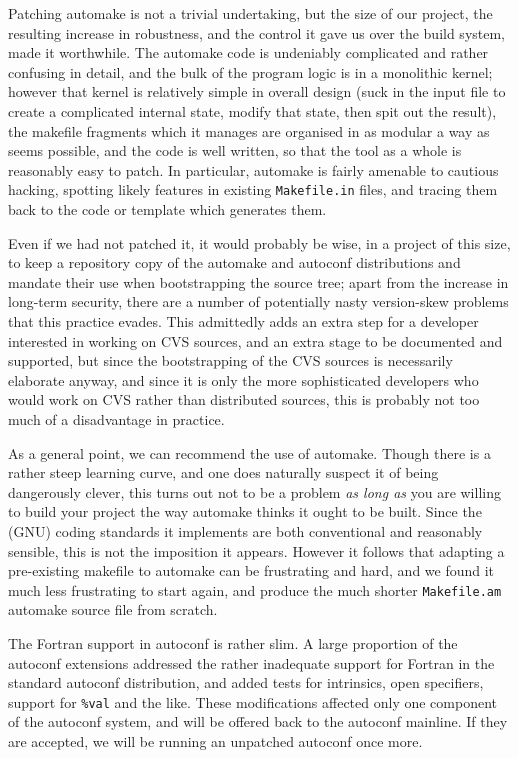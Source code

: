 \documentclass{speauth}
\begin{document}
Patching automake is not a trivial undertaking, but the size of our
project, the resulting increase in robustness, and the control it gave
us over the build system, made it worthwhile.  The automake code is
undeniably complicated and rather confusing in detail, and the bulk of
the program logic is in a monolithic kernel; however that kernel is
relatively simple in overall design (suck in the input file to create
a complicated internal state, modify that state, then spit out
the result), the makefile fragments which it manages are organised in
as modular a way as seems possible, and the code is well written, so
that the tool as a whole is reasonably easy to patch.  In particular,
automake is fairly amenable to cautious hacking, spotting likely
features in existing \texttt{Makefile.in} files, and tracing them back
to the code or template which generates them.

Even if we had not patched it, it
would probably be wise, in a project of this size, to keep a
repository copy of the automake and autoconf distributions and mandate
their use when bootstrapping the source tree; apart from the increase
in long-term security, there are a number of potentially nasty
version-skew problems that this practice evades.  This admittedly adds
an extra step for a developer interested in working on CVS sources,
and an extra stage to be documented and supported,
but since the bootstrapping of the CVS sources is necessarily
elaborate anyway, and since it is only the more sophisticated
developers who would work on CVS rather than distributed sources, this
is probably not too much of a disadvantage in practice.

As a general point, we can recommend the use of automake.  Though
there is a rather steep learning curve, and one does naturally suspect
it of being dangerously clever, this turns out not to be a problem
\emph{as long as} you are willing to build your project the way
automake thinks it ought to be built.  Since the (GNU) coding
standards it implements are both conventional and reasonably sensible,
this is not the imposition it appears.  However it follows that
adapting a pre-existing makefile to automake can be frustrating and
hard, and we found it much less frustrating to start again, and produce the
much shorter \texttt{Makefile.am} automake source file from scratch.

The Fortran support in autoconf is rather slim.  A large proportion of the
autoconf extensions addressed the rather inadequate support for
Fortran in the standard autoconf distribution, and added tests for
intrinsics, open specifiers, support for \texttt{\%val} 
and the like.  These modifications affected only one component of the
autoconf system, and will be offered back to the autoconf mainline.
If they are accepted, we will be running an unpatched autoconf once more.
\end{document}
